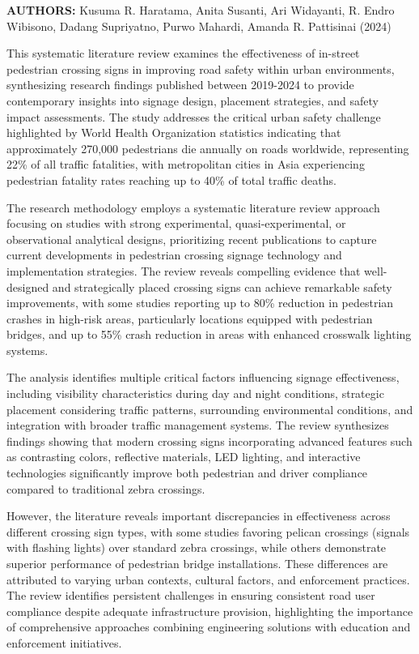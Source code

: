 \documentclass[a4paper, 12pt]{report}
\begin{document}
\textbf{AUTHORS:} Kusuma R. Haratama, Anita Susanti, Ari Widayanti, R. Endro Wibisono, Dadang Supriyatno, Purwo Mahardi, Amanda R. Pattisinai (2024)


This systematic literature review examines the effectiveness of in-street pedestrian crossing signs in improving road safety within urban environments, synthesizing research findings published between 2019-2024 to provide contemporary insights into signage design, placement strategies, and safety impact assessments. The study addresses the critical urban safety challenge highlighted by World Health Organization statistics indicating that approximately 270,000 pedestrians die annually on roads worldwide, representing 22\% of all traffic fatalities, with metropolitan cities in Asia experiencing pedestrian fatality rates reaching up to 40\% of total traffic deaths.

The research methodology employs a systematic literature review approach focusing on studies with strong experimental, quasi-experimental, or observational analytical designs, prioritizing recent publications to capture current developments in pedestrian crossing signage technology and implementation strategies. The review reveals compelling evidence that well-designed and strategically placed crossing signs can achieve remarkable safety improvements, with some studies reporting up to 80\% reduction in pedestrian crashes in high-risk areas, particularly locations equipped with pedestrian bridges, and up to 55\% crash reduction in areas with enhanced crosswalk lighting systems.

The analysis identifies multiple critical factors influencing signage effectiveness, including visibility characteristics during day and night conditions, strategic placement considering traffic patterns, surrounding environmental conditions, and integration with broader traffic management systems. The review synthesizes findings showing that modern crossing signs incorporating advanced features such as contrasting colors, reflective materials, LED lighting, and interactive technologies significantly improve both pedestrian and driver compliance compared to traditional zebra crossings.

However, the literature reveals important discrepancies in effectiveness across different crossing sign types, with some studies favoring pelican crossings (signals with flashing lights) over standard zebra crossings, while others demonstrate superior performance of pedestrian bridge installations. These differences are attributed to varying urban contexts, cultural factors, and enforcement practices. The review identifies persistent challenges in ensuring consistent road user compliance despite adequate infrastructure provision, highlighting the importance of comprehensive approaches combining engineering solutions with education and enforcement initiatives.
\end{document}
